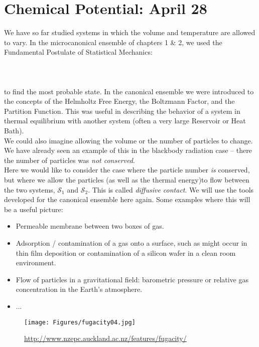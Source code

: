 \section{Chemical Potential: April 28}
We have so far studied systems in which the volume and temperature are allowed to vary. In the microcanonical ensemble of chapters 1 \& 2, we used the Fundamental Postulate of Statistical Mechanics:\\
\\
\\
\\
to find the most probable state. In the canonical ensemble we were introduced to the concepts of the Helmholtz Free Energy, the Boltzmann Factor, and the Partition Function. This was useful in describing the behavior of a system in thermal equilibrium with another system (often a very large Reservoir or Heat Bath).\\

We could also imagine allowing the volume or the number of particles to change. We have already seen an example of this in the blackbody radiation case -- there the number of particles was \textit{not conserved}.\\

Here we would like to consider the case where the particle number \emph{is} conserved, but where we allow the particles (as well as the thermal energy)to flow between the two systems, $\mathcal{S}_1$ and $\mathcal{S}_2$. 
This is called \textit{diffusive contact}. 
We will use the tools developed for the canonical ensemble here again.
Some examples where this will be a useful picture:
\begin{itemize}
\item Permeable membrane between two boxes of gas.
\item Adsorption / contamination of a gas onto a surface, such as might occur in thin film deposition or contamination of a silicon wafer in a clean room environment.
\item Flow of particles in a gravitational field: barometric pressure or relative gas concentration in the Earth's atmosphere.
\item ...
\end{itemize}

\begin{figure}[h]
\centering
\texttt{[image: Figures/fugacity04.jpg]}
\caption{\url{http://www.nzepc.auckland.ac.nz/features/fugacity/}}
\end{figure}

